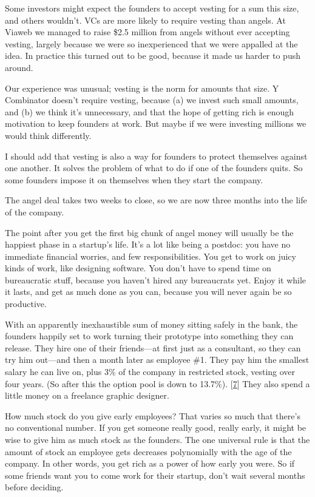 Some investors might expect the founders to accept vesting for a
sum this size, and others wouldn't.  VCs are more likely to require
vesting than angels.  At Viaweb we managed to raise \$2.5 million
from angels without ever accepting vesting, largely because we were
so inexperienced that we were appalled at the idea.  In practice
this turned out to be good, because it made us harder to push around.

Our experience was unusual; vesting is the norm for amounts that
size.  Y Combinator doesn't require vesting, because (a) we invest
such small amounts, and (b) we think it's unnecessary, and that the
hope of getting rich is enough motivation to keep founders at work.
But maybe if we were investing millions we would think differently.

I should add that vesting is also a way for founders to protect
themselves against one another.  It solves the problem of what to
do if one of the founders quits.  So some founders impose it on
themselves when they start the company.

The angel deal takes two weeks to close, so we are now three months
into the life of the company.

The point after you get the first big chunk of angel money will
usually be the happiest phase in a startup's life.  It's a lot like
being a postdoc: you have no immediate financial worries, and few
responsibilities.  You get to work on juicy kinds of work, like
designing software.  You don't have to spend time on bureaucratic
stuff, because you haven't hired any bureaucrats yet.  Enjoy it
while it lasts, and get as much done as you can, because you will
never again be so productive.

With an apparently inexhaustible sum of money sitting safely in the
bank, the founders happily set to work turning their prototype into
something they can release.  They hire one of their friends---at
first just as a consultant, so they can try him out---and then a
month later as employee \#1. They pay him the smallest salary he can
live on, plus 3\% of the company in restricted stock, vesting over
four years.  (So after this the option pool is down to 13.7\%).  
[\href{\#f7n}{7}]
They also spend a little money on a freelance graphic designer.

How much stock do you give early employees?  That varies so much
that there's no conventional number.  If you get someone really
good, really early, it might be wise to give him as much stock as
the founders.  The one universal rule is that the amount of stock
an employee gets decreases polynomially with the age of the company.
In other words, you get rich as a power of how early you were.  So
if some friends want you to come work for their startup, don't wait
several months before deciding.

